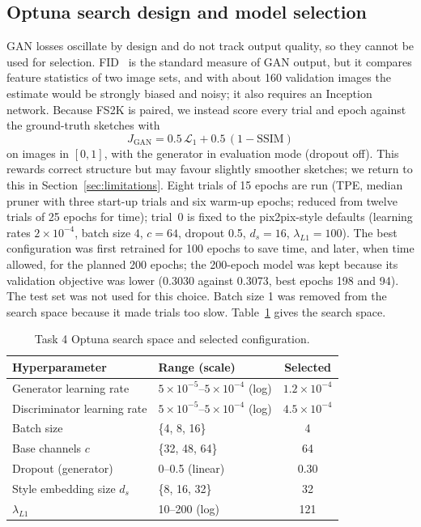 \documentclass[conference]{IEEEtran}
\begin{document}
\subsection{Optuna search design and model selection}
GAN losses oscillate by design and do not track output quality, so they
cannot be used for selection. FID~\cite{heusel2017gans} is the standard
measure of GAN output, but it compares feature statistics of two image sets,
and with about 160 validation images the estimate would be strongly biased
and noisy; it also requires an Inception network.
Because FS2K is paired, we instead score every trial and epoch against the
ground-truth sketches with
\begin{equation}
J_{\mathrm{GAN}} = 0.5\,\mathcal{L}_1 + 0.5\,(1-\mathrm{SSIM})
\end{equation}
on images in $[0,1]$, with the generator in evaluation mode (dropout off).
This rewards correct structure but may favour slightly smoother sketches;
we return to this in Section~\ref{sec:limitations}. Eight trials of 15
epochs are run (TPE, median pruner with three start-up trials and six
warm-up epochs; reduced from twelve trials of 25 epochs for time); trial~0
is fixed to the pix2pix-style defaults (learning rates
$2\times10^{-4}$, batch size 4, $c=64$, dropout 0.5, $d_s=16$,
$\lambda_{L1}=100$). The best configuration was first retrained for 100
epochs to save time, and later, when time allowed, for the planned 200
epochs; the 200-epoch model was kept because its validation objective was
lower (0.3030 against 0.3073, best epochs 198 and 94). The test set was not
used for this choice. Batch size 1 was removed from
the search space because it made trials too slow. Table~\ref{tab:task4_space} gives the search space.

\begin{table}[t]
\centering
\caption{Task 4 Optuna search space and selected configuration.}
\label{tab:task4_space}
\footnotesize
\begin{tabular}{llc}
\toprule
Hyperparameter & Range (scale) & Selected \\
\midrule
Generator learning rate & $5\times10^{-5}$--$5\times10^{-4}$ (log) & $1.2\times10^{-4}$ \\
Discriminator learning rate & $5\times10^{-5}$--$5\times10^{-4}$ (log) & $4.5\times10^{-4}$ \\
Batch size & \{4, 8, 16\} & 4 \\
Base channels $c$ & \{32, 48, 64\} & 64 \\
Dropout (generator) & 0--0.5 (linear) & 0.30 \\
Style embedding size $d_s$ & \{8, 16, 32\} & 32 \\
$\lambda_{L1}$ & 10--200 (log) & 121 \\
\bottomrule
\end{tabular}
\\[3pt]
\end{table}
\end{document}
